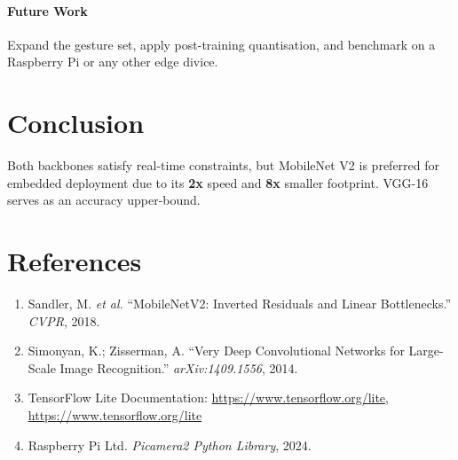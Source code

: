 \documentclass[a4paper,12pt]{article}
\begin{document}
\paragraph{Future Work} Expand the gesture set, apply post-training quantisation, and benchmark on a Raspberry Pi or any other edge divice.

\section{Conclusion}
Both backbones satisfy real-time constraints, but MobileNet V2 is preferred for embedded deployment due to its \textbf{2x} speed and \textbf{8x} smaller footprint. VGG-16 serves as an accuracy upper-bound.

\section{References}
\begin{enumerate}
\item Sandler, M. \emph{et al.} “MobileNetV2: Inverted Residuals and Linear Bottlenecks.” \emph{CVPR}, 2018.
\item Simonyan, K.; Zisserman, A. “Very Deep Convolutional Networks for Large-Scale Image Recognition.” \emph{arXiv:1409.1556}, 2014.
\item TensorFlow Lite Documentation: \url{https://www.tensorflow.org/lite}, \url{https://www.tensorflow.org/lite}
\item Raspberry Pi Ltd. \emph{Picamera2 Python Library}, 2024.
\end{enumerate}
\end{document}
